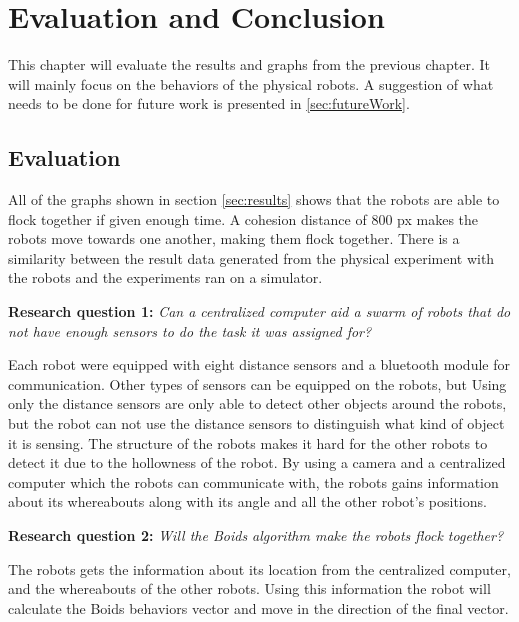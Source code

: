\chapter{Evaluation and Conclusion}
\label{cha:evaluationAndConclusion}
This chapter will evaluate the results and graphs from the previous chapter. It will mainly focus on the behaviors of the physical robots. A suggestion of what needs to be done for future work is presented in \ref{sec:futureWork}.



\section{Evaluation}
\label{sec:Evaluation}
All of the graphs shown in section \ref{sec:results} shows that the robots are able to flock together if given enough time. A cohesion distance of 800 px makes the robots move towards one another, making them flock together. There is a similarity between the result data generated from the physical experiment with the robots and the experiments ran on a simulator.

\textbf{Research question 1:} {\it Can a centralized computer aid a swarm of robots that do not have enough sensors to do the task it was assigned for?}

Each robot were equipped with eight distance sensors and a bluetooth module for communication. Other types of sensors can be equipped on the robots, but 
Using only the distance sensors are only able to detect other objects around the robots, but the robot can not use the distance sensors to distinguish what kind of object it is sensing. The structure of the robots makes it hard for the other robots to detect it due to the hollowness of the robot. 
By using a camera and a centralized computer which the robots can communicate with, the robots gains information about its whereabouts along with its angle and all the other robot's positions. 

\textbf{Research question 2:} {\it Will the Boids algorithm make the robots flock together?}

The robots gets the information about its location from the centralized computer, and the whereabouts of the other robots. Using this information the robot will calculate the Boids behaviors vector and move in the direction of the final vector.

